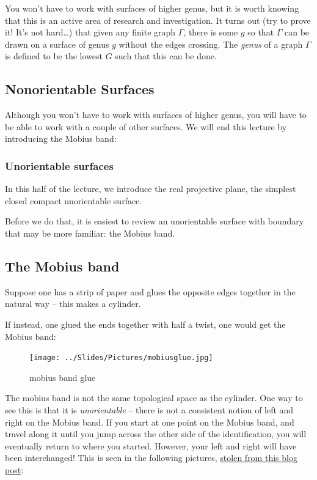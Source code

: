 \documentclass[]{article}
\begin{document}
You won't have to work with surfaces of higher genus, but it is worth
knowing that this is an active area of research and investigation. It
turns out (try to prove it! It's not hard\ldots{}) that given any finite
graph \(\Gamma\), there is some \(g\) so that \(\Gamma\) can be drawn on
a surface of genus \(g\) without the edges crossing. The \emph{genus} of
a graph \(\Gamma\) is defined to be the lowest \(G\) such that this can
be done.




\subsection{Nonorientable Surfaces}\label{nonorientable-surfaces}

Although you won't have to work with surfaces of higher genus, you will
have to be able to work with a couple of other surfaces. We will end
this lecture by introducing the Mobius band:

\subsubsection{Unorientable surfaces}\label{unorientable-surfaces}

In this half of the lecture, we introduce the real projective plane, the
simplest closed compact unorientable surface.

Before we do that, it is easiest to review an unorientable surface with
boundary that may be more familiar: the Mobius band.

\subsection{The Mobius band}\label{the-mobius-band}

Suppose one has a strip of paper and glues the opposite edges together
in the natural way -- this makes a cylinder.

If instead, one glued the ends together with half a twist, one would get
the Mobius band:

\begin{figure}[htbp]
\centering
\texttt{[image: ../Slides/Pictures/mobiusglue.jpg]}
\caption{mobius band glue}
\end{figure}

The mobius band is not the same topological space as the cylinder. One
way to see this is that it is \emph{unorientable} -- there is not a
consistent notion of left and right on the Mobius band. If you start at
one point on the Mobius band, and travel along it until you jump across
the other side of the identification, you will eventually return to
where you started. However, your left and right will have been
interchanged! This is seen in the following pictures,
\href{https://haggisthesheep.wordpress.com/2009/06/15/mobius-strips/}{stolen
from this blog post}:
\end{document}
